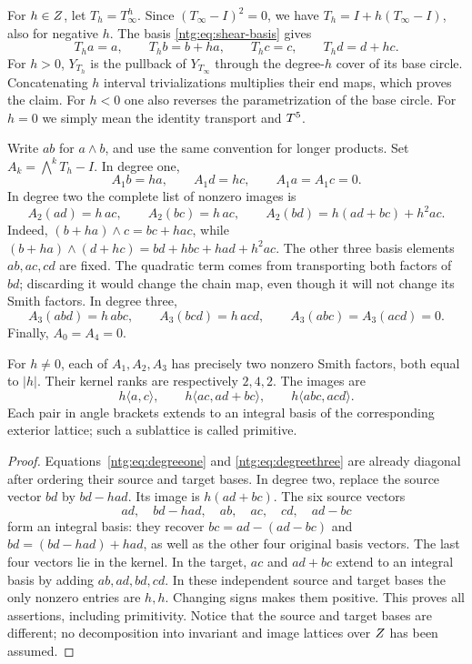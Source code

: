 For $h\in Z$, let $T_h=T_\infty^h$. Since
$(T_\infty-I)^2=0$, we have $T_h=I+h(T_\infty-I)$, also for
negative $h$. The basis \eqref{ntg:eq:shear-basis} gives
\[
 T_ha=a,\qquad T_hb=b+ha,\qquad
 T_hc=c,\qquad T_hd=d+hc.
\]
For $h>0$, $Y_{T_h}$ is the pullback of $Y_{T_\infty}$ through
the degree-$h$ cover of its base circle. Concatenating $h$ interval
trivializations multiplies their end maps, which proves the claim.
For $h<0$ one also reverses the parametrization of the base circle.
For $h=0$ we simply mean the identity transport and $T^5$.

Write $ab$ for $a\wedge b$, and use the same convention for longer
products. Set $A_k=\bigwedge^kT_h-I$. In degree one,
\begin{equation}\label{ntg:eq:degreeone}
 A_1b=ha,\qquad A_1d=hc,\qquad A_1a=A_1c=0.
\end{equation}
In degree two the complete list of nonzero images is
\begin{equation}\label{ntg:eq:degreetwo}
 A_2(ad)=h\,ac,\qquad A_2(bc)=h\,ac,
 \qquad A_2(bd)=h(ad+bc)+h^2ac.
\end{equation}
Indeed, $(b+ha)\wedge c=bc+hac$, while
$(b+ha)\wedge(d+hc)=bd+hbc+had+h^2ac$.
The other three basis elements $ab,ac,cd$ are fixed. The quadratic
term comes from transporting both factors of $bd$; discarding it
would change the chain map, even though it will not change its Smith
factors. In degree three,
\begin{equation}\label{ntg:eq:degreethree}
 A_3(abd)=h\,abc,\qquad A_3(bcd)=h\,acd,
 \qquad A_3(abc)=A_3(acd)=0.
\end{equation}
Finally, $A_0=A_4=0$.

\begin{lemma}\label{ntg:lem:shear-smith}
For $h\ne0$, each of $A_1,A_2,A_3$ has precisely two nonzero
Smith factors, both equal to $|h|$. Their kernel ranks are respectively
$2,4,2$. The images are
\[
 h\langle a,c\rangle,\qquad
 h\langle ac,ad+bc\rangle,\qquad
 h\langle abc,acd\rangle.
\]
Each pair in angle brackets extends to an integral basis of the
corresponding exterior lattice; such a sublattice is called primitive.
\end{lemma}
\begin{proof}
Equations~\eqref{ntg:eq:degreeone} and \eqref{ntg:eq:degreethree} are already
diagonal after ordering their source and target bases. In degree two,
replace the source vector $bd$ by $bd-had$. Its image is
$h(ad+bc)$. The six source vectors
\[
 ad,\quad bd-had,\quad ab,\quad ac,\quad cd,\quad ad-bc
\]
form an integral basis: they recover $bc=ad-(ad-bc)$ and
$bd=(bd-had)+had$, as well as the other four original basis vectors.
The last four vectors lie in the kernel. In the target, $ac$ and
$ad+bc$ extend to an integral basis by adding $ab,ad,bd,cd$.
In these independent source and target bases the only nonzero entries
are $h,h$. Changing signs makes them positive. This proves all
assertions, including primitivity. Notice that the source and target
bases are different; no decomposition into invariant and image
lattices over $Z$ has been assumed.
\end{proof}

